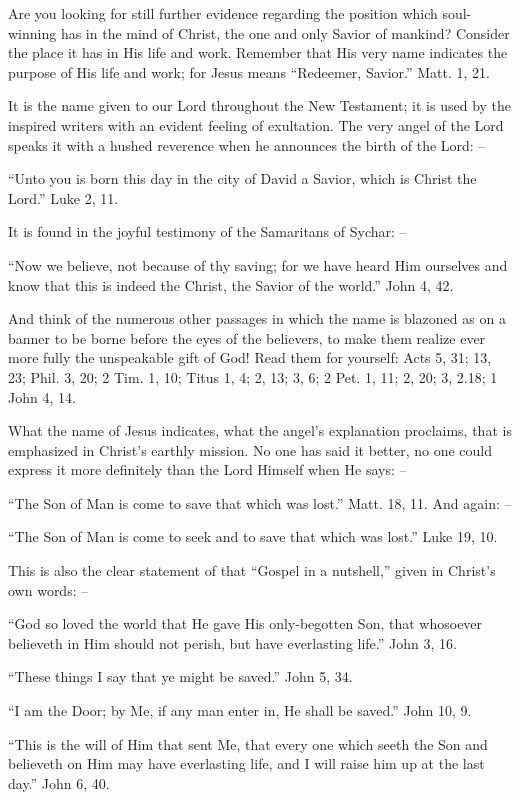 \documentclass[
]{book}
\begin{document}
Are you looking for still further evidence regarding the position which soul-winning has in the mind of Christ, the one and only Savior of mankind? Consider the place it has in His life and work. Remember that His very name indicates the purpose of His life and work; for Jesus means ``Redeemer, Savior.'' Matt. 1, 21.

It is the name given to our Lord throughout the New Testament; it is used by the inspired writers with an evident feeling of exultation. The very angel of the Lord speaks it with a hushed reverence when he announces the birth of the Lord: --

``Unto you is born this day in the city of David a Savior, which is Christ the Lord.'' Luke 2, 11.

It is found in the joyful testimony of the Samaritans of Sychar: --

``Now we believe, not because of thy saving; for we have heard Him ourselves and know that this is indeed the Christ, the Savior of the world.'' John 4, 42.

And think of the numerous other passages in which the name is blazoned as on a banner to be borne before the eyes of the believers, to make them realize ever more fully the unspeakable gift of God! Read them for yourself: Acts 5, 31; 13, 23; Phil. 3, 20; 2 Tim. 1, 10; Titus 1, 4; 2, 13; 3, 6; 2 Pet. 1, 11; 2, 20; 3, 2.18; 1 John 4, 14.

What the name of Jesus indicates, what the angel's explanation proclaims, that is emphasized in Christ's earthly mission. No one has said it better, no one could express it more definitely than the Lord Himself when He says: --

``The Son of Man is come to save that which was lost.'' Matt. 18, 11. And again: --

``The Son of Man is come to seek and to save that which was lost.'' Luke 19, 10.

This is also the clear statement of that ``Gospel in a nutshell,'' given in Christ's own words: --

``God so loved the world that He gave His only-begotten Son, that whosoever believeth in Him should not perish, but have everlasting life.'' John 3, 16.

``These things I say that ye might be saved.'' John 5, 34.

``I am the Door; by Me, if any man enter in, He shall be saved.'' John 10, 9.

``This is the will of Him that sent Me, that every one which seeth the Son and believeth on Him may have everlasting life, and I will raise him up at the last day.'' John 6, 40.
\end{document}
